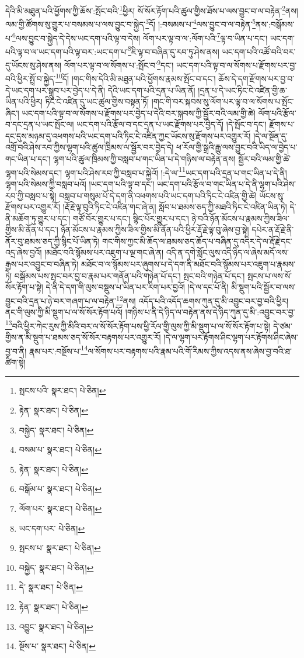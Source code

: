 དེའི་མི་མཐུན་པའི་ཕྱོགས་ཀྱི་ཆོས་:སྤོང་བའི་\footnote{སྤངས་པའི་  སྣར་ཐང་།  པེ་ཅིན། }ཕྱིར། སོ་སོར་རྟོག་པའི་ཚུལ་གྱིས་ཐོས་པ་ལས་བྱུང་བ་ལ་བརྟེན་\footnote{རྟེན་  སྣར་ཐང་།  པེ་ཅིན། }ནས། ལམ་གྱི་ཚོགས་སུ་གྱུར་པ་བསམས་པ་ལས་བྱུང་བ་སྐྱེད་\footnote{བསྐྱེད་  སྣར་ཐང་།  པེ་ཅིན། }དོ། །:བསམས་པ་\footnote{བསམ་པ་  སྣར་ཐང་།  པེ་ཅིན། }ལས་བྱུང་བ་ལ་བརྟེན་\footnote{རྟེན་  སྣར་ཐང་།  པེ་ཅིན། }ནས་:བསྒོམས་པ་\footnote{བསྒོམ་པ་  སྣར་ཐང་།  པེ་ཅིན། }ལས་བྱུང་བ་སྐྱེད་དེ་དེས་ཡང་དག་པའི་ལྟ་བ་དེས། ལོག་པར་ལྟ་བ་ལ་:ལོག་པའི་\footnote{ལོག་པར་  སྣར་ཐང་།  པེ་ཅིན། }ལྟ་བ་ཡིན་པ་དང་། ཡང་དག་པའི་ལྟ་བ་ལ་ཡང་དག་པའི་ལྟ་བར་:ཡང་དག་པ་\footnote{ཡང་དག་པར་  པེ་ཅིན། }ཇི་ལྟ་བ་བཞིན་དུ་རབ་ཏུ་ཤེས་ནས། ཡང་དག་པའི་འཚོ་བའི་བར་དུ་ཡོངས་སུ་ཤེས་ནས། ལོག་པར་ལྟ་བ་ལ་སོགས་པ་:སྤོང་བ་\footnote{སྤངས་པ་  སྣར་ཐང་།  པེ་ཅིན། }དང་། ཡང་དག་པའི་ལྟ་བ་ལ་སོགས་པ་རྫོགས་པར་བྱ་བའི་ཕྱིར་སྤྲོ་བ་སྐྱེད་\footnote{བསྐྱེད་  སྣར་ཐང་།  པེ་ཅིན། }དོ། །གང་གིས་དེའི་མི་མཐུན་པའི་ཕྱོགས་རྣམས་སྤོང་བ་དང་། ཆོས་དེ་དག་རྫོགས་པར་བྱ་བ་དེ་ཡང་དག་པར་སྒྲུབ་པར་བྱེད་པ་དེ་ནི། དེའི་ཡང་དག་པའི་དྲན་པ་ཡིན་ནོ། །དྲན་པ་དེ་ཡང་ཏིང་ངེ་འཛིན་གྱི་ཆ་ཡིན་པའི་ཕྱིར། ཏིང་ངེ་འཛིན་དུ་ཡང་ཚུལ་གྱིས་བསྟན་ཏོ། །གང་གི་བར་སྐབས་སུ་ལོག་པར་ལྟ་བ་ལ་སོགས་པ་སྤོང་ཞིང་། ཡང་དག་པའི་ལྟ་བ་ལ་སོགས་པ་རྫོགས་པར་བྱེད་པ་དེའི་བར་སྐབས་ཀྱི་སྦྱོར་བའི་ལམ་གྱི་ཚེ། ལོག་པའི་རྩོལ་བ་དང་དྲན་པ་ཡང་སྤོང་ལ། ཡང་དག་པའི་རྩོལ་བ་དང་དྲན་པ་ཡང་རྫོགས་པར་བྱེད་དོ། །དེ་སྤོང་བ་དང་། རྫོགས་པ་དང་དུས་མཉམ་དུ་འཕགས་པའི་ཡང་དག་པའི་ཏིང་ངེ་འཛིན་ཀྱང་ཡོངས་སུ་རྫོགས་པར་འགྱུར་རོ། །དེ་ལ་སྔོན་དུ་འགྲོ་བའི་ཤེས་རབ་ཀྱིས་ལྷག་པའི་ཚུལ་ཁྲིམས་ལ་སྦྱོར་བར་བྱེད་དེ། ཕ་རོལ་གྱི་སྒྲའི་རྒྱུ་ལས་བྱུང་བའི་ཡིད་ལ་བྱེད་པ་གང་ཡིན་པ་དང་། ལྷག་པའི་ཚུལ་ཁྲིམས་ཀྱི་བསླབ་པ་གང་ཡིན་པ་དེ་གཉིས་ལ་བརྟེན་ནས། སྦྱོར་བའི་ལམ་གྱི་ཚེ་ལྷག་པའི་སེམས་དང་། ལྷག་པའི་ཤེས་རབ་ཀྱི་བསླབ་པ་སྐྱེའོ། །:དེ་ལ་\footnote{དེ་  སྣར་ཐང་།  པེ་ཅིན། }ཡང་དག་པའི་དྲན་པ་གང་ཡིན་པ་དེ་ནི། ལྷག་པའི་སེམས་ཀྱི་བསླབ་པའོ། །ཡང་དག་པའི་ལྟ་བ་དང་། ཡང་དག་པའི་རྩོལ་བ་གང་ཡིན་པ་དེ་ནི་ལྷག་པའི་ཤེས་རབ་ཀྱི་བསླབ་པ་སྟེ། བསླབ་པ་གསུམ་པོ་དེ་དག་ནི་འཕགས་པའི་ཡང་དག་པའི་ཏིང་ངེ་འཛིན་གྱི་ཚེ། ཡོངས་སུ་རྫོགས་པར་འགྱུར་རོ། །རྡོ་རྗེ་ལྟ་བུའི་ཏིང་ངེ་འཛིན་གང་ཞེ་ན། སློབ་པ་ཐམས་ཅད་ཀྱི་མཐའི་ཏིང་ངེ་འཛིན་ཡིན་ཏེ། དེ་ནི་མཆོག་ཏུ་གྱུར་པ་དང་། གཙོ་བོར་གྱུར་པ་དང་། སྙིང་པོར་གྱུར་པ་དང་། ཉེ་བའི་ཉོན་མོངས་པ་རྣམས་ཀྱིས་ཟིལ་གྱིས་མི་ནོན་པ་དང་། ཉོན་མོངས་པ་རྣམས་ཀྱིས་ཟིལ་གྱིས་མི་ནོན་པའི་ཕྱིར་རྡོ་རྗེ་ལྟ་བུ་ཞེས་བྱ་སྟེ། དཔེར་ན་རྡོ་རྗེ་ནི་ནོར་བུ་ཐམས་ཅད་ཀྱི་སྙིང་པོ་ཡིན་ཏེ། གང་གིས་ཀྱང་མི་ཆོད་ལ་ཐམས་ཅད་ཆོད་པ་བཞིན་དུ་འདིར་དེ་ལ་རྡོ་རྗེ་དང་འདྲ་ཞེས་བྱའོ། །མཐོང་བའི་སྙོམས་པར་འཇུག་པ་ལྔ་གང་ཞེ་ན། འདི་ན་དགེ་སློང་ལུས་འདི་ཉིད་ལ་ཞེས་མདོ་ལས་རྒྱས་པར་འབྱུང་བ་བཞིན་ཏེ། མཐོང་བ་ལ་སྙོམས་པར་ཞུགས་པ་དེ་དག་ནི་མཐོང་བའི་སྙོམས་པར་འཇུག་པ་རྣམས་ཏེ། བསྒོམས་པས་སྤང་བར་བྱ་བ་རྣམ་པར་གནོན་པའི་གཉེན་པོ་དང་། སྤང་བའི་གཉེན་པོ་དང་། སྤངས་པ་ལས་སོ་སོར་རྟོག་པ་སྟེ། དེ་ནི་དེ་དག་གི་ལུས་བསྡུས་པ་ཡིན་པར་རིག་པར་བྱའོ། །དེ་ལ་དང་པོ་ནི། མི་སྡུག་པའི་སྦྱོར་བ་ལས་བྱུང་བའི་དྲན་པ་ཉེ་བར་གཞག་པ་ལ་བརྟེན་\footnote{རྟེན་  སྣར་ཐང་།  པེ་ཅིན། }ནས། འདོད་པའི་འདོད་ཆགས་ཀུན་དུ་མི་འབྱུང་བར་བྱ་བའི་ཕྱིར། ནང་གི་ལུས་ཀྱི་མི་སྡུག་པ་ལ་སོ་སོར་རྟོག་པའོ། །གཉིས་པ་ནི་དེ་ཉིད་ལ་བརྟེན་ནས་དེ་ཉིད་ཀུན་དུ་མི་:འབྱུང་བར་བྱ་\footnote{འབྱུང་  སྣར་ཐང་།  པེ་ཅིན། }བའི་ཕྱིར་ཀེང་རུས་ཀྱི་མིའི་བར་ལ་སོ་སོར་རྟོག་པས་ཕྱི་རོལ་གྱི་ལུས་ཀྱི་མི་སྡུག་པ་ལ་སོ་སོར་རྟོག་པ་སྟེ། དེ་ཙམ་གྱིས་ན་མི་སྡུག་པ་ཐམས་ཅད་སོ་སོར་བརྟགས་པར་འགྱུར་རོ། །དེ་ལ་ལྷག་པར་རྟོགས་ཤིང་ལྷག་པར་རྟོགས་ཤིང་ཞེས་བྱ་བ་ནི། རྣམ་པར་:བསྔོས་པ་\footnote{སྔོས་པ་  སྣར་ཐང་།  པེ་ཅིན། }ལ་སོགས་པར་བརྟགས་པའི་རྣམ་པའི་གོ་རིམས་ཀྱིས་འདས་ནས་ཞེས་བྱ་བའི་ཐ་ཚིག་སྟེ། 